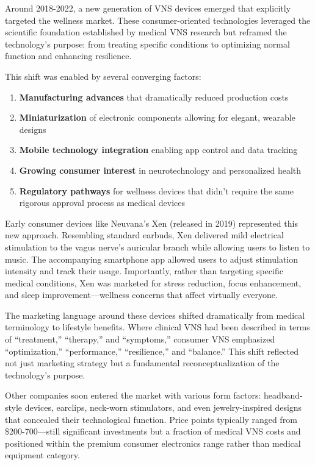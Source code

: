 \documentclass[
  Letterpaper,
]{scrbook}
\providecommand{\tightlist}{%
  \setlength{\itemsep}{0pt}\setlength{\parskip}{0pt}}\usepackage{longtable,booktabs,array}
\begin{document}
Around 2018-2022, a new generation of VNS devices emerged that
explicitly targeted the wellness market. These consumer-oriented
technologies leveraged the scientific foundation established by medical
VNS research but reframed the technology's purpose: from treating
specific conditions to optimizing normal function and enhancing
resilience.

This shift was enabled by several converging factors:

\begin{enumerate}
\def\labelenumi{\arabic{enumi}.}
\tightlist
\item
  \textbf{Manufacturing advances} that dramatically reduced production
  costs
\item
  \textbf{Miniaturization} of electronic components allowing for
  elegant, wearable designs
\item
  \textbf{Mobile technology integration} enabling app control and data
  tracking
\item
  \textbf{Growing consumer interest} in neurotechnology and personalized
  health
\item
  \textbf{Regulatory pathways} for wellness devices that didn't require
  the same rigorous approval process as medical devices
\end{enumerate}

Early consumer devices like Neuvana's Xen (released in 2019) represented
this new approach. Resembling standard earbuds, Xen delivered mild
electrical stimulation to the vagus nerve's auricular branch while
allowing users to listen to music. The accompanying smartphone app
allowed users to adjust stimulation intensity and track their usage.
Importantly, rather than targeting specific medical conditions, Xen was
marketed for stress reduction, focus enhancement, and sleep
improvement---wellness concerns that affect virtually everyone.

The marketing language around these devices shifted dramatically from
medical terminology to lifestyle benefits. Where clinical VNS had been
described in terms of ``treatment,'' ``therapy,'' and ``symptoms,''
consumer VNS emphasized ``optimization,'' ``performance,''
``resilience,'' and ``balance.'' This shift reflected not just marketing
strategy but a fundamental reconceptualization of the technology's
purpose.

Other companies soon entered the market with various form factors:
headband-style devices, earclips, neck-worn stimulators, and even
jewelry-inspired designs that concealed their technological function.
Price points typically ranged from \$200-700---still significant
investments but a fraction of medical VNS costs and positioned within
the premium consumer electronics range rather than medical equipment
category.
\end{document}
